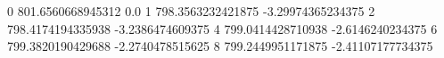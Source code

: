 0 801.6560668945312 0.0
1 798.3563232421875 -3.29974365234375
2 798.4174194335938 -3.2386474609375
4 799.0414428710938 -2.6146240234375
6 799.3820190429688 -2.2740478515625
8 799.2449951171875 -2.41107177734375
